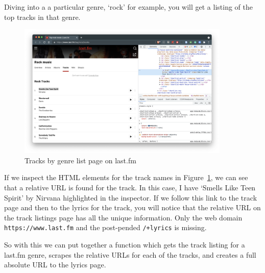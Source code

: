 \documentclass[
  letterpaper,
]{latex/krantz}
\begin{document}
Diving into a a particular genre, `rock' for example, you will get a
listing of the top tracks in that genre.

\begin{figure}[h]

{\centering \includegraphics[width=0.9\textwidth,height=\textheight]{./figures/acquire-data/ad-lastfm-genre-tracks-list.png}

}

\caption{\label{fig-ad-genre-tracks-list-lastfm}Tracks by genre list
page on last.fm}

\end{figure}

If we inspect the HTML elements for the track names in
Figure~\ref{fig-ad-genre-tracks-list-lastfm}, we can see that a relative
URL is found for the track. In this case, I have `Smells Like Teen
Spirit' by Nirvana highlighted in the inspector. If we follow this link
to the track page and then to the lyrics for the track, you will notice
that the relative URL on the track listings page has all the unique
information. Only the web domain \texttt{https://www.last.fm} and the
post-pended \texttt{/+lyrics} is missing.

So with this we can put together a function which gets the track listing
for a last.fm genre, scrapes the relative URLs for each of the tracks,
and creates a full absolute URL to the lyrics page.
\end{document}
